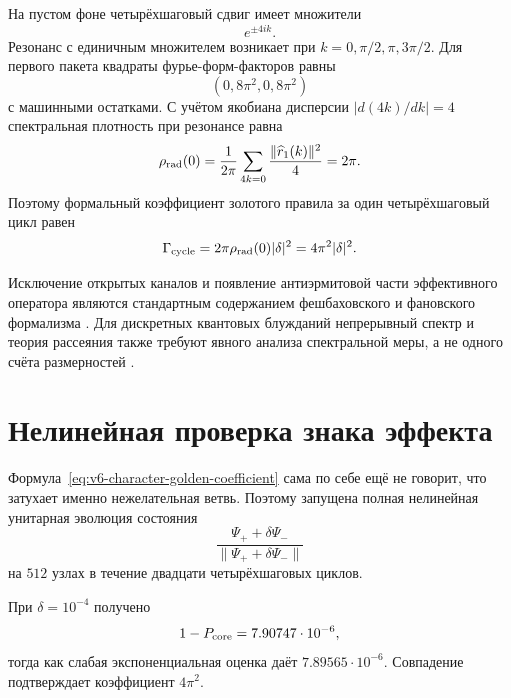 На пустом фоне четырёхшаговый сдвиг имеет множители
\begin{equation}
 e^{\pm4ik}.
\end{equation}
Резонанс с единичным множителем возникает при
$k=0,\pi/2,\pi,3\pi/2$. Для первого пакета квадраты фурье-форм-факторов
равны
\begin{equation}
 (0,8\pi^2,0,8\pi^2)
\end{equation}
с машинными остатками. С учётом якобиана дисперсии $|d(4k)/dk|=4$
спектральная плотность при резонансе равна
\begin{equation}
 \rho_{\rm rad}(0)
 =\frac1{2\pi}\sum_{4k=0}
 \frac{\|\widehat r_1(k)\|^2}{4}
 =2\pi.
 \label{eq:v6-character-radiation-density}
\end{equation}
Поэтому формальный коэффициент золотого правила за один четырёхшаговый
цикл равен
\begin{equation}
 \Gamma_{\rm cycle}
 =2\pi\rho_{\rm rad}(0)|\delta|^2
 =4\pi^2|\delta|^2.
 \label{eq:v6-character-golden-coefficient}
\end{equation}

Исключение открытых каналов и появление антиэрмитовой части эффективного
оператора являются стандартным содержанием фешбаховского и фановского
формализма \cite{character-radiation-feshbach1958,
character-radiation-fano1961}. Для дискретных квантовых блужданий
непрерывный спектр и теория рассеяния также требуют явного анализа
спектральной меры, а не одного счёта размерностей
\cite{character-radiation-bisio2021}.

\section{Нелинейная проверка знака эффекта}

Формула~\eqref{eq:v6-character-golden-coefficient} сама по себе ещё не
говорит, что затухает именно нежелательная ветвь. Поэтому запущена полная
нелинейная унитарная эволюция состояния
\begin{equation}
 \frac{\Psi_++\delta\Psi_-}
 {\|\Psi_++\delta\Psi_-\|}
\end{equation}
на $512$ узлах в течение двадцати четырёхшаговых циклов.

При $\delta=10^{-4}$ получено
\begin{equation}
 1-P_{\rm core}=7.90747\cdot10^{-6},
\end{equation}
тогда как слабая экспоненциальная оценка даёт
$7.89565\cdot10^{-6}$. Совпадение подтверждает коэффициент $4\pi^2$.

